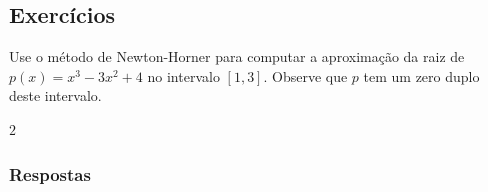 \subsection{Exercícios}

\badgeRevisar

\begin{exer}
  Use o método de Newton-Horner para computar a aproximação da raiz de $p(x) = x^3 - 3x^2 + 4$ no intervalo $[1,3]$. Observe que $p$ tem um zero duplo deste intervalo.
\end{exer}
\begin{resp}
  $2$
\end{resp}

\ifisbook
\subsubsection{Respostas}
\shipoutAnswer
\fi

